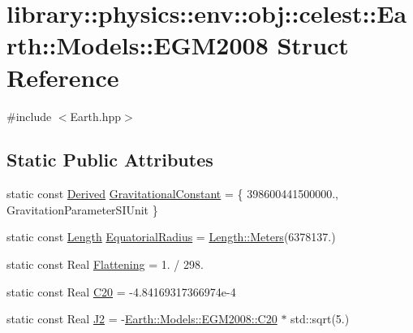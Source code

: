 \hypertarget{structlibrary_1_1physics_1_1env_1_1obj_1_1celest_1_1_earth_1_1_models_1_1_e_g_m2008}{}\section{library\+:\+:physics\+:\+:env\+:\+:obj\+:\+:celest\+:\+:Earth\+:\+:Models\+:\+:E\+G\+M2008 Struct Reference}
\label{structlibrary_1_1physics_1_1env_1_1obj_1_1celest_1_1_earth_1_1_models_1_1_e_g_m2008}


{\ttfamily \#include $<$Earth.\+hpp$>$}

\subsection*{Static Public Attributes}
\begin{DoxyCompactItemize}
\item 
static const \hyperlink{classlibrary_1_1physics_1_1units_1_1_derived}{Derived} \hyperlink{structlibrary_1_1physics_1_1env_1_1obj_1_1celest_1_1_earth_1_1_models_1_1_e_g_m2008_a02c5dbd0f81a016942d7d5146a782efd}{Gravitational\+Constant} = \{ 398600441500000., Gravitation\+Parameter\+S\+I\+Unit \}
\item 
static const \hyperlink{classlibrary_1_1physics_1_1units_1_1_length}{Length} \hyperlink{structlibrary_1_1physics_1_1env_1_1obj_1_1celest_1_1_earth_1_1_models_1_1_e_g_m2008_aa96d890bf95fc1b611ffbb13581284dd}{Equatorial\+Radius} = \hyperlink{classlibrary_1_1physics_1_1units_1_1_length_ad523a3737d5c3f23a64588eac83f2148}{Length\+::\+Meters}(6378137.)
\item 
static const Real \hyperlink{structlibrary_1_1physics_1_1env_1_1obj_1_1celest_1_1_earth_1_1_models_1_1_e_g_m2008_aff355d04ec56fb5b1f589fd2bc855193}{Flattening} = 1. / 298.
\item 
static const Real \hyperlink{structlibrary_1_1physics_1_1env_1_1obj_1_1celest_1_1_earth_1_1_models_1_1_e_g_m2008_a70cf03c48fda3badebf10588c83e183d}{C20} = -\/4.\+84169317366974e-\/4
\item 
static const Real \hyperlink{structlibrary_1_1physics_1_1env_1_1obj_1_1celest_1_1_earth_1_1_models_1_1_e_g_m2008_ac8e230ca34d03fca1377fb593af57e3a}{J2} = -\/\hyperlink{structlibrary_1_1physics_1_1env_1_1obj_1_1celest_1_1_earth_1_1_models_1_1_e_g_m2008_a70cf03c48fda3badebf10588c83e183d}{Earth\+::\+Models\+::\+E\+G\+M2008\+::\+C20} $\ast$ std\+::sqrt(5.)
\end{DoxyCompactItemize}



